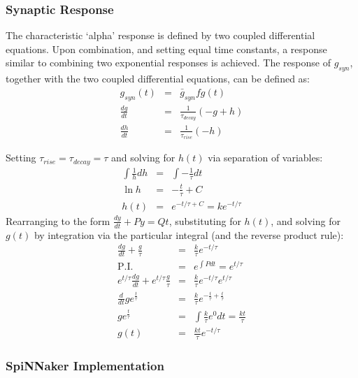 \documentclass[12pt]{article}
\begin{document}
\subsubsection*{Synaptic Response}
The characteristic `alpha' response is defined by two coupled differential
equations.  Upon combination, and setting equal time constants, a response
similar to combining two exponential responses is achieved. The response of
$g_{syn}$, together with the two coupled differential equations, can be defined
as:
\begin{eqnarray}
g_{syn}(t) & = & \bar{g}_{syn}fg(t) \nonumber \\
\frac{dg}{dt} & = & \frac{1}{\tau_{decay}} (-g + h) \nonumber \\
\frac{dh}{dt} & = & \frac{1}{\tau_{rise}}(-h) \nonumber
\label{eqn:alpha_coupled_diff_eqns}
\end{eqnarray}

Setting $\tau_{rise}=\tau_{decay} = \tau$ and solving for $h(t)$ via separation
of variables:
\begin{eqnarray}
\int \frac{1}{h} dh & = & \int -\frac{1}{\tau}dt \nonumber \\
\ln{h}&=&-\frac{t}{\tau} + C \nonumber \\
h(t) & = & e^{-{t/\tau}+C} = ke^{-t / \tau} \nonumber
\label{eqn:solve_for_h}
\end{eqnarray}
Rearranging to the form $\frac{dy}{dt} +Py = Qt$, substituting  for $h(t)$, and
solving for $g(t)$ by integration via the particular integral (and the reverse
product rule):
\begin{eqnarray}
\frac{dg}{dt} + \frac{g}{\tau}&=&\frac{k}{\tau}e^{-t/\tau} \nonumber\\
\mathrm{P.I.}&=& e^{\int P dt} = e^{t/ \tau} \nonumber \\
e^{t/\tau}\frac{dg}{dt} + e^{t/\tau}\frac{g}{\tau}
&=& \frac{k}{\tau}e^{-t/\tau}e^{t/\tau} \nonumber \\
\frac{d}{dt} g e^{\frac{t}{\tau}}&=&\frac{k}{\tau}e^{-\frac{t}{\tau}
+\frac{t}{\tau}} \nonumber \\
g e^{\frac{t}{\tau}} &=& \int \frac{k}{\tau}e^0 dt  =  \frac{kt}{\tau} \nonumber \\
g(t)&=&\frac{kt}{\tau}e^{-t/\tau}
\end{eqnarray}


\subsubsection*{SpiNNaker Implementation}
\end{document}
